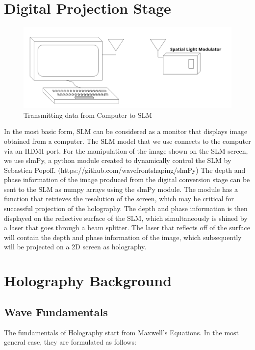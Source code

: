 \documentclass[12pt]{article}
\begin{document}
\newpage
\section{Digital Projection Stage}

\begin{figure}
    \centering
    \includegraphics[width=\textwidth]{transmission}
    \caption{Transmitting data from Computer to SLM}
    \label{fig:my_label}
\end{figure}

In the most basic form, SLM can be considered as a monitor that displays image obtained from a computer. The SLM model that we use connects to the computer via an HDMI port. For the manipulation of the image shown on the SLM screen, we use slmPy, a python module created to dynamically control the SLM by Sebastien Popoff. (https://github.com/wavefrontshaping/slmPy)
The depth and phase information of the image produced from the digital conversion stage can be sent to the SLM as numpy arrays using the slmPy module. The module has a function that retrieves the resolution of the screen, which may be critical for successful projection of the holography. The depth and phase information is then displayed on the reflective surface of the SLM, which simultaneously is shined by a laser that goes through a beam splitter. The laser that reflects off of the surface will contain the depth and phase information of the image, which subsequently will be projected on a 2D screen as holography.


\section{Holography Background}

\subsection{Wave Fundamentals}

The fundamentals of Holography start from Maxwell's Equations. In the most general case, they are formulated as follows:
\end{document}
